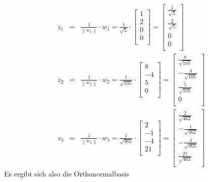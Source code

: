 \documentclass{article}
\begin{document}
				\begin{eqnarray*}
					z_1 &=& \frac{1}{\left\lVert w_1 \right\rVert} \cdot w_1 = \frac1{\sqrt{5}} \cdot \begin{bmatrix} 1 \\ 2 \\ 0 \\ 0 \\ \end{bmatrix} = \begin{bmatrix} \frac1{\sqrt{5}} \\ \frac2{\sqrt{5}} \\ 0 \\ 0 \\ \end{bmatrix} \\
					z_2 &=& \frac{1}{\left\lVert w_2 \right\rVert} \cdot w_2 = \frac1{\sqrt{105}} \cdot \begin{bmatrix} 8 \\ -4 \\ 5 \\ 0 \\ \end{bmatrix} = \begin{bmatrix} \frac8{\sqrt{105}} \\ -\frac4{\sqrt{105}} \\ \frac5{\sqrt{105}} \\ 0 \\ \end{bmatrix} \\
					z_3 &=& \frac{1}{\left\lVert w_3 \right\rVert} \cdot w_3 = \frac1{\sqrt{462}} \cdot \begin{bmatrix} 2 \\ -1 \\ -4 \\ 21 \\ \end{bmatrix} = \begin{bmatrix} \frac2{\sqrt{462}} \\ -\frac1{\sqrt{462}} \\ -\frac4{\sqrt{462}} \\ \frac{21}{\sqrt{462}} \\ \end{bmatrix}
				\end{eqnarray*}
				Es ergibt sich also die Orthonormalbasis
\end{document}
